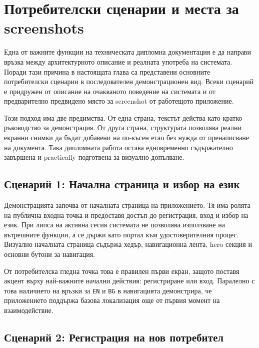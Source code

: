 \section{Потребителски сценарии и места за screenshots}

Една от важните функции на техническата дипломна документация е да направи връзка между архитектурното описание и реалната употреба на системата. Поради тази причина в настоящата глава са представени основните потребителски сценарии в последователен демонстрационен вид. Всеки сценарий е придружен от описание на очакваното поведение на системата и от предварително предвидено място за screenshot от работещото приложение.

Този подход има две предимства. От една страна, текстът действа като кратко ръководство за демонстрация. От друга страна, структурата позволява реални екранни снимки да бъдат добавени на по-късен етап без нужда от пренаписване на документа. Така дипломната работа остава едновременно съдържателно завършена и practically подготвена за визуално допълване.

\subsection{Сценарий 1: Начална страница и избор на език}

Демонстрацията започва от началната страница на приложението. Тя има ролята на публична входна точка и предоставя достъп до регистрация, вход и избор на език. При липса на активна сесия системата не позволява използване на вътрешните функции, а се държи като портал към удостоверителния процес. Визуално началната страница съдържа хедър, навигационна лента, hero секция и основни бутони за навигация.

От потребителска гледна точка това е правилен първи екран, защото поставя акцент върху най-важните начални действия: регистриране или вход. Паралелно с това наличието на връзки за \texttt{EN} и \texttt{BG} в навигацията демонстрира, че приложението поддържа базова локализация още от първия момент на взаимодействие.


\subsection{Сценарий 2: Регистрация на нов потребител}

